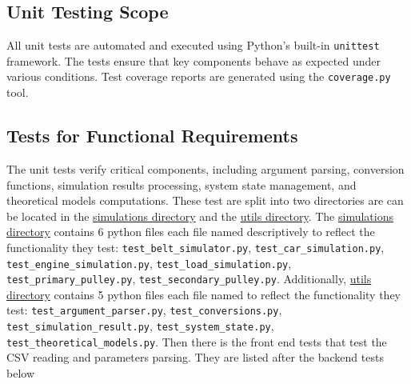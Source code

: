 \documentclass[12pt, titlepage]{article}
\begin{document}
\subsection{Unit Testing Scope}
All unit tests are automated and executed using Python’s built-in \texttt{unittest} framework. The tests ensure that key components behave as expected under various conditions. Test coverage reports are generated using the \texttt{coverage.py} tool.

\subsection{Tests for Functional Requirements}
The unit tests verify critical components, including argument parsing, conversion functions, simulation results processing, system state management, and theoretical models computations.
These test are split into two directories are can be located in the \href{https://github.com/gr812b/CVT-Simulator/tree/main/test/simulations}{simulations directory} and the \href{https://github.com/gr812b/CVT-Simulator/tree/main/test/utils}{utils directory}.
The \href{https://github.com/gr812b/CVT-Simulator/tree/main/test/simulations}{simulations directory} contains 6 python files each file named descriptively to reflect the functionality they test: \texttt{test\_belt\_simulator.py}, \texttt{test\_car\_simulation.py}, \texttt{test\_engine\_simulation.py}, \texttt{test\_load\_simulation.py}, \texttt{test\_primary\_pulley.py}, \texttt{test\_secondary\_pulley.py}. 
Additionally, \href{https://github.com/gr812b/CVT-Simulator/tree/main/test/utils}{utils directory} contains 5 python files each file named to reflect the functionality they test: \texttt{test\_argument\_parser.py}, \texttt{test\_conversions.py}, \\ \texttt{test\_simulation\_result.py}, \texttt{test\_system\_state.py}, \\ \texttt{test\_theoretical\_models.py}.
Then there is the front end tests that test the CSV reading and parameters parsing. They are listed after the backend tests below\\
\end{document}
